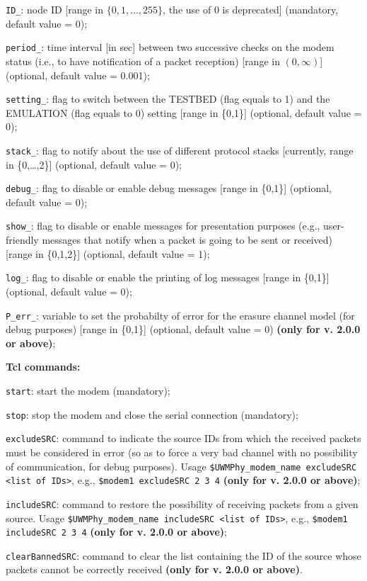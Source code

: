\begin{description}
         \begin{description}
          \item {\tt ID\_}: node ID [range in $\{0,1,\dots,255\}$, the use of $0$ is deprecated] (mandatory, default value = 0);
          \item {\tt period\_}: time interval [in sec] between two successive checks on the modem status (i.e., to have notification of a packet reception) [range in $(0,\infty)$] (optional, default value = 0.001);
          \item{\tt setting\_}: flag to switch between the TESTBED (flag equals to 1) and the EMULATION (flag equals to 0) setting [range in \{0,1\}] (optional, default value = 0);
          \item{\tt stack\_}: flag to notify about the use of different protocol stacks [currently, range in \{0,\dots,2\}] (optional, default value = 0);
          \item {\tt debug\_}: flag to disable or enable debug messages [range in \{0,1\}] (optional, default value = 0);
          \item {\tt show\_}: flag to disable or enable messages for presentation purposes (e.g., user-friendly messages that notify when a packet is going to be sent or received) [range in \{0,1,2\}] (optional, default value = 1);
          \item {\tt log\_}: flag to disable or enable the printing of log messages [range in \{0,1\}] (optional, default value = 0);
          \item{\tt P\_err\_}: variable to set the probabilty of error for the erasure channel model (for debug purposes) [range in \{0,1\}] (optional, default value = 0) {\bf (only for v. 2.0.0 or above)};
         \end{description} 
   \item {\bf Tcl commands:}
         \begin{description}
          \item {\tt start}: start the modem (mandatory);
          \item {\tt stop}: stop the modem and close the serial connection (mandatory);
          \item {\tt excludeSRC}: command to indicate the source IDs from which the received packets must be considered in error (so as to force a very bad channel with no possibility of communication, for debug purposes). Usage {\tt \$UWMPhy\_modem\_name excludeSRC <list of IDs>}, e.g., {\tt \$modem1 excludeSRC 2 3 4} {\bf (only for v. 2.0.0 or above)};
          \item {\tt includeSRC}: command to restore the possibility of receiving packets from a given source. Usage {\tt \$UWMPhy\_modem\_name includeSRC <list of IDs>}, e.g., {\tt \$modem1 includeSRC 2 3 4} {\bf (only for v. 2.0.0 or above)}; \item {\tt clearBannedSRC}: command to clear the list containing the ID of the source whose packets cannot be correctly received {\bf (only for v. 2.0.0 or above)}.

\end{description}
\end{description}
